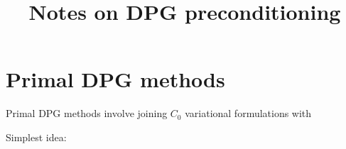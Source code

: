 \documentclass[final,leqno]{siamltex}
\title{Notes on DPG preconditioning}
\begin{document}
\maketitle

\section{Primal DPG methods}

Primal DPG methods involve joining $C_0$ variational formulations with

Simplest idea:
\end{document}

